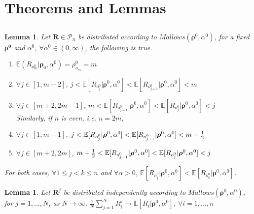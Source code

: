 \documentclass[11pt, oneside]{article}   	%
\newtheorem{lemma}[theorem]{Lemma}
\begin{document}
\begin{itemize}
\end{itemize}

\section{Theorems and Lemmas}
\subsection{ }
\begin{lemma} \label{lem:nocross}
Let $\bm{R}\in \mathcal{P}_n$ be distributed according to $Mallows(\bm{\rho}^0, \alpha^0)$, for a fixed $\bm{\rho^0}$ and $\alpha^0$, $\forall \alpha^0 \in (0, \infty)$, the following is true.

	\begin{enumerate} 
		 If $n$ is odd, i.e., $n = 2m - 1$,
		\item{$\mathbb{E}(R_{o^0_m}|\bm{\rho}_{0}, \alpha^0) = \rho^0_{o_m} = m$ }
		\item{$\forall j \in [1, m-2]$, $j< \mathbb{E}[R_{o^0_j}|\bm{\rho}^0, \alpha^0] <\mathbb{E}[R_{o^0_{j+1}}|\bm{\rho}^0, \alpha^0] < m$}
		\item{$\forall j \in [m+2, 2m-1]$, $m< \mathbb{E}[R_{o^0_{j-1}}|\bm{\rho}^0, \alpha^0] <\mathbb{E}[R_{o^0_{j}}|\bm{\rho}^0, \alpha^0] < j$}\\		
Similarly, if $n$ is even, i.e. $n = 2m$, 

	\item{$\forall j \in [1, m-1]$, $j< \mathbb{E}[R_{o^0_j}|\bm{\rho}^0, \alpha^0] <\mathbb{E}[R_{o^0_{j+1}}|\bm{\rho}^0, \alpha^0] < m+ {1\over 2}$}
	\item{$\forall j \in [m+2, 2m]$, $m+ {1\over 2}<\mathbb{E}[R_{o^0_{j-1}}|\bm{\rho}^0, \alpha^0] <\mathbb{E}[R_{o^0_{j}}|\bm{\rho}^0, \alpha^0] < j$}
\end{enumerate}
For both cases, $\forall 1\leq j<k\leq n$ and $\forall \alpha > 0 $,
{$\mathbb{E}[R_{o^0_j}|\bm{\rho}^0, \alpha^0]<\mathbb{E}[R_{o^0_k}|\bm{\rho}^0, \alpha^0]$}.
\end{lemma}

\begin{lemma}\label{lem:largenumbers}
 Let $\bm{R}^j$ be distributed independently according to $Mallows (\bm{\rho}^0, \alpha^0)$, for $j = 1, ...,N$, as $N \rightarrow \infty$, $\frac{1}{N}\sum\limits_{j=1}^{N}R^j_i \rightarrow \mathbb{E}[R_i|\bm{\rho}^0, \alpha ^0]$, $\forall i = 1, ..., n$
\end{lemma}
\end{document}
